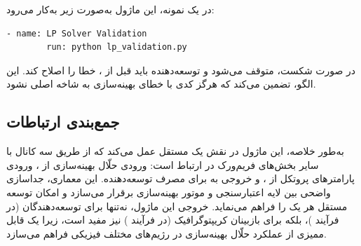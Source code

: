در یک  نمونه، این ماژول به‌صورت زیر به‌کار می‌رود:

\begin{LTR}
	\begin{lstlisting}[language=bash]
		- name: LP Solver Validation
		run: python lp_validation.py
	\end{lstlisting}
\end{LTR}

در صورت شکست،  متوقف می‌شود و توسعه‌دهنده باید قبل از ، خطا را اصلاح کند. این الگو، تضمین می‌کند که هرگز کدی با خطای بهینه‌سازی به شاخه اصلی  نشود.

\subsection{جمع‌بندی ارتباطات}

به‌طور خلاصه، این ماژول در نقش یک  مستقل عمل می‌کند که از طریق سه کانال با سایر بخش‌های فریم‌ورک در ارتباط است: ورودی حلّال بهینه‌سازی از ، ورودی پارامترهای پروتکل از ، و خروجی به  برای مصرف توسعه‌دهنده. این معماری، جداسازی واضحی بین لایه اعتبارسنجی و موتور بهینه‌سازی برقرار می‌سازد و امکان توسعه مستقل هر یک را فراهم می‌نماید. خروجی این ماژول، نه‌تنها برای توسعه‌دهندگان (در فرآیند )، بلکه برای بازبینان کریپتوگرافیک (در فرآیند ) نیز مفید است، زیرا یک  قابل ممیزی از عملکرد حلّال بهینه‌سازی در رژیم‌های مختلف فیزیکی فراهم می‌سازد.
